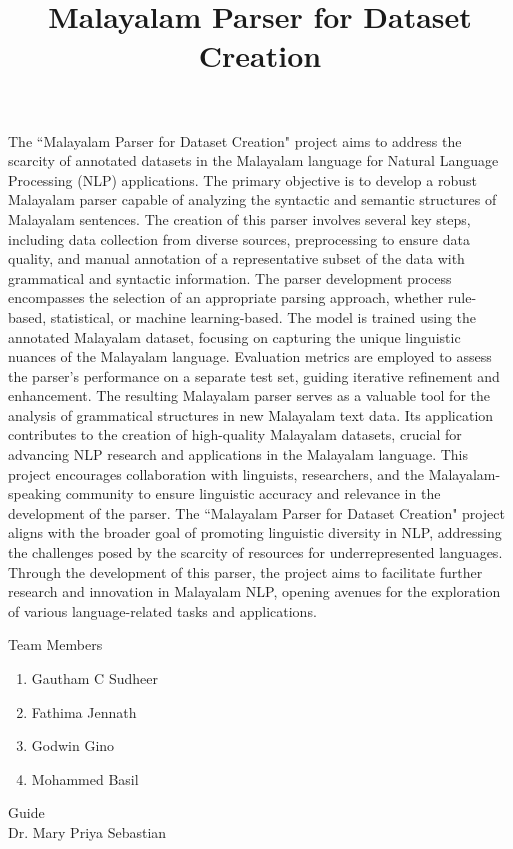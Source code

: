 \documentclass[12pt]{article}
\title{Malayalam Parser for Dataset Creation}
\author{}
\date{}
\begin{document}
	
	\maketitle
	\thispagestyle{empty}
	
	The ``Malayalam Parser for Dataset Creation" project aims to address the scarcity of annotated datasets in the Malayalam language for Natural Language Processing (NLP) applications. The primary objective is to develop a robust Malayalam parser capable of analyzing the syntactic and semantic structures of Malayalam sentences. The creation of this parser involves several key steps, including data collection from diverse sources, preprocessing to ensure data quality, and manual annotation of a representative subset of the data with grammatical and syntactic information. The parser development process encompasses the selection of an appropriate parsing approach, whether rule-based, statistical, or machine learning-based. The model is trained using the annotated Malayalam dataset, focusing on capturing the unique linguistic nuances of the Malayalam language. Evaluation metrics are employed to assess the parser's performance on a separate test set, guiding iterative refinement and enhancement. The resulting Malayalam parser serves as a valuable tool for the analysis of grammatical structures in new Malayalam text data. Its application contributes to the creation of high-quality Malayalam datasets, crucial for advancing NLP research and applications in the Malayalam language. This project encourages collaboration with linguists, researchers, and the Malayalam-speaking community to ensure linguistic accuracy and relevance in the development of the parser. The ``Malayalam Parser for Dataset Creation" project aligns with the broader goal of promoting linguistic diversity in NLP, addressing the challenges posed by the scarcity of resources for underrepresented languages. Through the development of this parser, the project aims to facilitate further research and innovation in Malayalam NLP, opening avenues for the exploration of various language-related tasks and applications.
	
	\bigskip
	Team Members
	\begin{enumerate}
		\item Gautham C Sudheer
		\item Fathima Jennath
		\item Godwin Gino
		\item Mohammed Basil
	\end{enumerate}
	\bigskip
	
	Guide\\
	Dr. Mary Priya Sebastian
	
\end{document}
